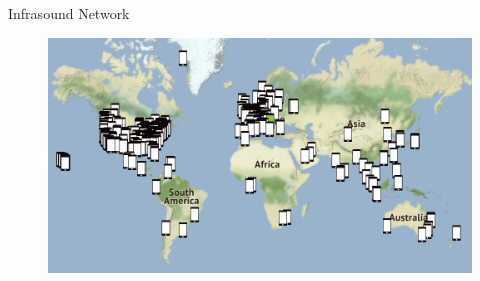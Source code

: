 \documentclass{beamer}
\begin{document}
\begin{frame}{Infrasound Network}
\begin{figure}
	\includegraphics[width=\linewidth]{img/network.png}
\end{figure}
\end{frame}
\end{document}
